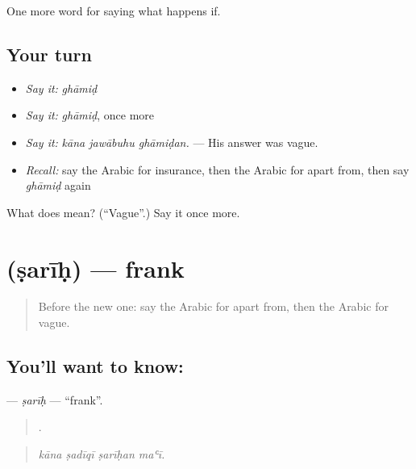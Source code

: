 \begin{grammarlens}[title={What you've built}]
One more word for saying what happens if.
\end{grammarlens}

\subsection*{Your turn}
\begin{itemize}
\raggedright
  \item \emph{Say it:} \emph{ghāmiḍ}
  \item \emph{Say it:} \emph{ghāmiḍ}, once more
  \item \emph{Say it:} \emph{kāna jawābuhu ghāmiḍan.} — His answer was vague.
  \item \emph{Recall:} say the Arabic for insurance, then the Arabic for apart from, then say \emph{ghāmiḍ} again
\end{itemize}

\begin{tcolorbox}[breakable,colback=teal!4,colframe=teal!35!black,title={Before you move on}]
What does  mean? (\textquotedblleft{}Vague\textquotedblright{}.) Say it once more.
\end{tcolorbox}
\section[\texorpdfstring{\ar{صريح} (ṣarīḥ)}{صريح (ṣarīḥ)}]{ (ṣarīḥ) — frank}

\label{lesson:AR-C417-sarih}



\begin{quote}
Before the new one: say the Arabic for apart from, then the Arabic for vague.
\end{quote}

\subsection*{You'll want to know: }
\textbf{} — \emph{ṣarīḥ} — \textquotedblleft{}frank\textquotedblright{}.

\begin{quote}
   .
\end{quote}

\begin{quote}
\emph{kāna ṣadīqī ṣarīḥan maʿī.}
\end{quote}

